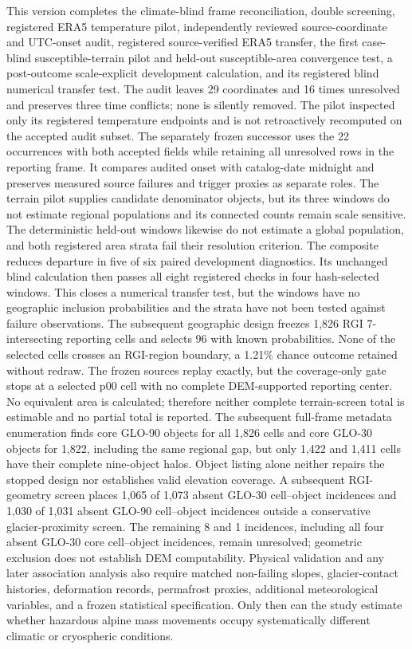 \documentclass[11pt]{article}
\begin{document}
This version completes the climate-blind frame reconciliation, double
screening, registered ERA5 temperature pilot, independently reviewed
source-coordinate and UTC-onset audit, registered source-verified ERA5
transfer, the first case-blind susceptible-terrain pilot and held-out
susceptible-area convergence test, a post-outcome scale-explicit development
calculation, and its registered blind numerical transfer test. The audit leaves
29 coordinates and 16
times unresolved and preserves three time conflicts; none is silently removed.
The pilot inspected only its registered temperature endpoints and is not
retroactively recomputed on the accepted audit subset. The separately frozen
successor uses the 22 occurrences with both accepted fields while retaining
all unresolved rows in the reporting frame. It compares audited onset with
catalog-date midnight and preserves measured source failures and trigger
proxies as separate roles.
The terrain pilot supplies candidate denominator objects, but its three windows
do not estimate regional populations and its connected counts remain scale
sensitive. The deterministic held-out windows likewise do not estimate a
global population, and both registered area strata fail their resolution
criterion. The composite reduces departure in five of six paired development
diagnostics. Its unchanged blind calculation then passes all eight registered
checks in four hash-selected windows. This closes a numerical transfer test,
but the windows have no geographic inclusion probabilities and the strata have
not been tested against failure observations. The subsequent geographic design
freezes 1,826 RGI 7-intersecting reporting cells and selects 96 with known
probabilities. None of the selected cells crosses an RGI-region boundary, a
1.21\% chance outcome retained without redraw. The frozen sources replay
exactly, but the coverage-only gate stops at a selected p00 cell with no
complete DEM-supported reporting center. No equivalent area is calculated;
therefore neither complete terrain-screen total is estimable and no partial
total is reported. The subsequent full-frame metadata enumeration finds core
GLO-90 objects for all 1,826 cells and core GLO-30 objects for 1,822, including
the same regional gap, but only 1,422 and 1,411 cells have their complete
nine-object halos. Object listing alone neither repairs the stopped design nor
establishes valid elevation coverage. A subsequent RGI-geometry screen places
1,065 of 1,073 absent GLO-30 cell--object incidences and 1,030 of 1,031 absent
GLO-90 cell--object incidences outside a conservative glacier-proximity
screen. The remaining 8 and 1 incidences, including all four absent GLO-30
core cell--object incidences, remain
unresolved; geometric exclusion does not establish DEM computability.
Physical validation and any later association analysis also
require matched non-failing slopes, glacier-contact histories, deformation
records, permafrost proxies, additional meteorological variables, and a frozen
statistical specification. Only then can the study estimate whether hazardous
alpine mass movements occupy systematically different climatic or cryospheric
conditions.
\end{document}
